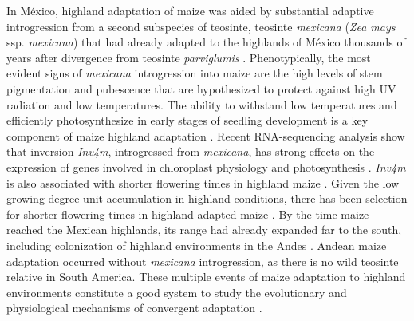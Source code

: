 \documentclass[9pt,twocolumn,twoside,lineno]{BioRxiv}
\begin{document}
In México, highland adaptation of maize was aided by substantial adaptive introgression from a second subspecies of teosinte, teosinte \textit{mexicana} (\textit{Zea mays} ssp. \textit{mexicana}) that had already adapted to the highlands of México thousands of years after divergence from teosinte \textit{parviglumis} \cite{Hufford2013-gs, Gonzalez-Segovia2019-jy}. 
Phenotypically, the most evident signs of \textit{mexicana} introgression into maize are the high levels of stem pigmentation and pubescence \cite{Lauter2004-eq} that are hypothesized to protect against high UV radiation and low temperatures. 
The ability to withstand low temperatures and efficiently photosynthesize in early stages of seedling development is a key component of maize highland adaptation \cite{Hardacre1980-tq}.
Recent RNA-sequencing analysis show that inversion \textit{Inv4m}, introgressed from \textit{mexicana}, has strong effects on the expression of genes involved in chloroplast physiology and photosynthesis \cite{Crow2020-gene}.  
\textit{Inv4m} is also associated with shorter flowering times in highland maize \cite{Romero_Navarro2017-cn, Gates2019-xu}. 
Given the low growing degree unit accumulation in highland conditions, there has been selection for shorter flowering times in highland-adapted maize \cite{Gates2019-xu}.
By the time maize reached the Mexican highlands, its range had already expanded far to the south, including colonization of highland environments in the  Andes \cite{Athens2016-ep, Grobman2012-pm}. 
Andean maize adaptation occurred without \textit{mexicana} introgression, as there is no wild teosinte relative in South America.
These multiple events of maize adaptation to highland environments constitute a good system to study the evolutionary and physiological mechanisms of convergent adaptation \cite{Takuno2015-uj, Wang2020-mp}.
\end{document}
